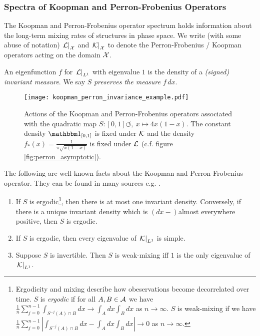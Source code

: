 \subsubsection{Spectra of Koopman and Perron-Frobenius Operators}

The Koopman and Perron-Frobenius operator spectrum holds information about the long-term 
mixing rates of structures in phase space. We write (with some abuse of notation) 
$\left. \mathcal{L} \right|_{\mathcal{X}}$ and $\left. \mathcal{K} \right|_{\mathcal{X}}$ to denote the 
Perron-Frobenius / Koopman operators acting on the domain $\mathcal{X}$. 

\begin{definition}
    An eigenfunction $f$ for $\left. \mathcal{L} \right|_{L^1}$ with eigenvalue $1$ is the 
    density of a \emph{(signed) invariant measure}. We say $S$ \emph{preserves the 
    measure $f\,dx$}. 
\end{definition}

\begin{figure}
    \centering
    \texttt{[image: koopman\_perron\_invariance\_example.pdf]}
    \caption{
        Actions of the Koopman and Perron-Frobenius operators associated with the quadratic 
        map $S : [0, 1] \circlearrowleft,\ x \mapsto 4 x (1 - x)$. The constant density 
        $\bbone_{[0, 1]}$ is fixed under $\mathcal{K}$ and the density 
        $f_* (x) = \frac{1}{\pi \sqrt{ x (1 - x) }}$ is fixed under $\mathcal{L}$ (c.f. figure 
        \ref{fig:perron_asymptotic}). 
    }
\end{figure}

The following are well-known facts about the Koopman and Perron-Frobenius operator. They 
can be found in many sources e.g. \cite{lasotamackey}. 

\begin{theorem}
    \begin{enumerate}
        \item If $S$ is ergodic\footnote{Ergodicity and mixing describe how obeservations 
            become decorrelated over time. $S$ is \emph{ergodic} if for all $A, B \in \mathcal{A}$ 
            we have $\frac{1}{n}\sum_{j=0}^{n-1} \int_{ S^{-j} (A) \cap B } dx \to 
            \int_A dx \int_B dx$ as $n \to \infty$. $S$ is weak-mixing if we have 
            $\frac{1}{n}\sum_{j=0}^{n-1} \left| \int_{ S^{-j} (A) \cap B } dx 
            - \int_A dx \int_B dx \right| \to 0$ as $n \to \infty$. },
            then there is at most one invariant density. Conversely, if there is a unique 
            invariant density which is $(dx-)$almost everywhere positive, then $S$ is 
            ergodic. 
        \item If $S$ is ergodic, then every eigenvalue of $\left. \mathcal{K} \right|_{L^1}$ 
            is simple. 
        \item Suppose $S$ is invertible. Then $S$ is weak-mixing iff $1$ is the only 
            eigenvalue of $\left. \mathcal{K} \right|_{L^1}$. 
    \end{enumerate}
\end{theorem}

